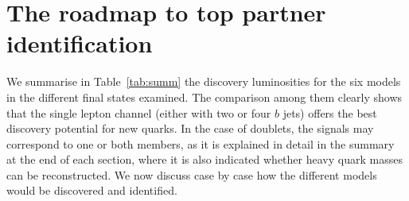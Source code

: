 \documentclass[12pt,a4paper]{article}
\begin{document}
\section{The roadmap to top partner identification}
\label{sec:summ}


We summarise in Table~\ref{tab:summ} the discovery luminosities for the six models in the different final states examined. The comparison among them clearly shows that the single lepton channel (either with two or four $b$ jets) offers the best discovery potential for new quarks. In the case of doublets, the signals may correspond to one or both members, as it is explained in detail in the summary at the end of each section, where it is also indicated whether heavy quark masses can be reconstructed. We now discuss case by case how the different models would be discovered and identified.
\end{document}
